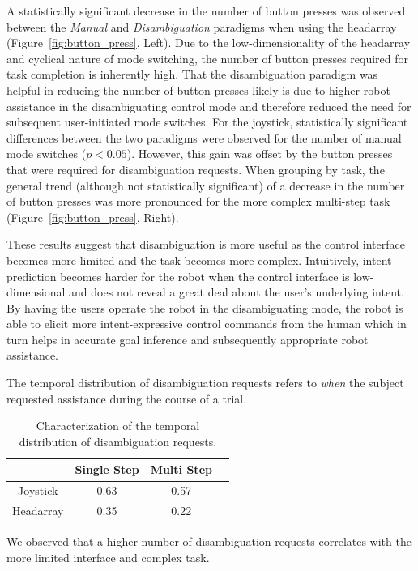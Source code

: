 \documentclass[journal]{IEEEtran}
\begin{document}
 A statistically significant decrease in the number of button presses was observed between the \textit{Manual} and \textit{Disambiguation} paradigms when using the headarray (Figure~\ref{fig:button_press}, Left). Due to the low-dimensionality of the headarray and cyclical nature of mode switching, the number of button presses required for task completion is inherently high. That the disambiguation paradigm was helpful in reducing the number of button presses likely is due to higher robot assistance in the disambiguating control mode and therefore reduced the need for subsequent user-initiated mode switches.
For the joystick, statistically significant differences between the two paradigms were observed for the number of manual mode switches  ($p < 0.05$). However, this gain was offset by the button presses that were required for disambiguation requests. When grouping by task, the general trend (although not statistically significant) of a decrease in the number of button presses was more pronounced for the more complex multi-step task (Figure~\ref{fig:button_press}, Right). 

These results suggest that disambiguation is more useful as the control interface becomes more limited and the task becomes more complex. Intuitively, intent prediction becomes harder for the robot when the control interface is low-dimensional and does not reveal a great deal about the user's underlying intent. By having the users operate the robot in the disambiguating mode, the robot is able to elicit more intent-expressive control commands from the human which in turn helps in accurate goal inference and subsequently appropriate robot assistance. 

The temporal distribution of disambiguation requests refers to \textit{when} the subject requested assistance during the course of a trial.
\begin{table}[t]
	\centering
	\caption{Characterization of the temporal distribution of disambiguation requests. }
	\label{table:skewness}
	\begin{tabular}{|c|c|c|c|}
		\hline
		& Single Step & Multi Step \\
		\hline
		Joystick & 0.63 & 0.57 \\
		\hline
		Headarray & 0.35 & 0.22 \\
		\hline
	\end{tabular}
\end{table}
We observed that a higher number of disambiguation requests correlates with the more limited interface and complex task.
\end{document}
